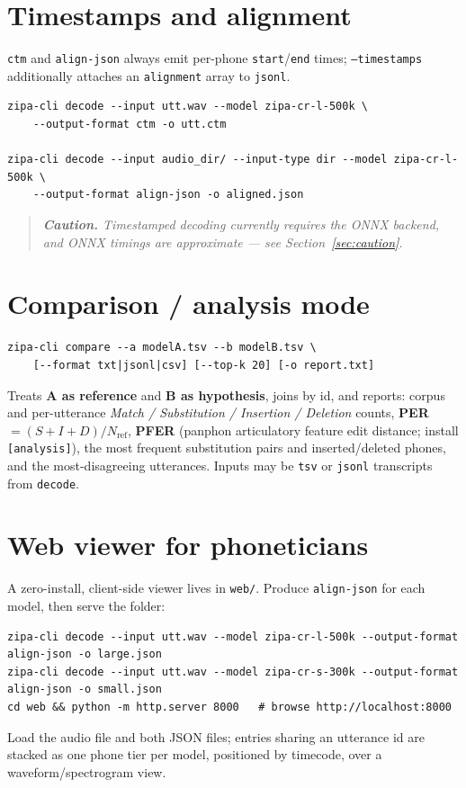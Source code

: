 \documentclass[11pt,a4paper]{article}
\newcommand{\code}[1]{\texttt{#1}}
\begin{document}
\section{Timestamps and alignment}
\code{ctm} and \code{align-json} always emit per-phone \code{start}/\code{end} times;
\code{--timestamps} additionally attaches an \code{alignment} array to \code{jsonl}.

\begin{lstlisting}
zipa-cli decode --input utt.wav --model zipa-cr-l-500k \
    --output-format ctm -o utt.ctm

zipa-cli decode --input audio_dir/ --input-type dir --model zipa-cr-l-500k \
    --output-format align-json -o aligned.json
\end{lstlisting}

\begin{quote}\itshape
\textbf{Caution.} Timestamped decoding currently requires the ONNX backend, and ONNX
timings are approximate --- see Section~\ref{sec:caution}.
\end{quote}

\section{Comparison / analysis mode}
\begin{lstlisting}
zipa-cli compare --a modelA.tsv --b modelB.tsv \
    [--format txt|jsonl|csv] [--top-k 20] [-o report.txt]
\end{lstlisting}
Treats \textbf{A as reference} and \textbf{B as hypothesis}, joins by id, and reports:
corpus and per-utterance \emph{Match / Substitution / Insertion / Deletion} counts,
\textbf{PER} $=(S+I+D)/N_{\text{ref}}$, \textbf{PFER} (panphon articulatory feature
edit distance; install \code{[analysis]}), the most frequent substitution pairs and
inserted/deleted phones, and the most-disagreeing utterances. Inputs may be
\code{tsv} or \code{jsonl} transcripts from \code{decode}.

\section{Web viewer for phoneticians}
A zero-install, client-side viewer lives in \code{web/}. Produce \code{align-json}
for each model, then serve the folder:
\begin{lstlisting}
zipa-cli decode --input utt.wav --model zipa-cr-l-500k --output-format align-json -o large.json
zipa-cli decode --input utt.wav --model zipa-cr-s-300k --output-format align-json -o small.json
cd web && python -m http.server 8000   # browse http://localhost:8000
\end{lstlisting}
Load the audio file and both JSON files; entries sharing an utterance id are stacked
as one phone tier per model, positioned by timecode, over a waveform/spectrogram view.
\end{document}
